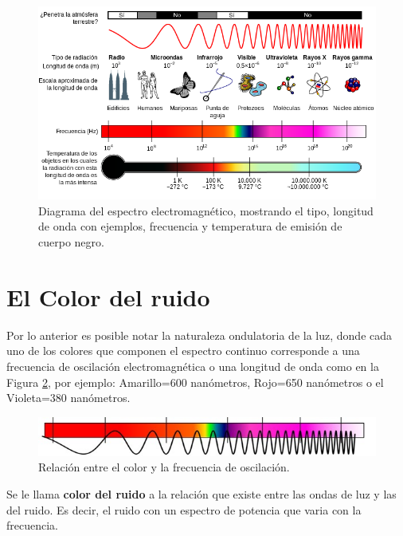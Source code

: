 \documentclass[letterpaper,titlepage,12pt,draft]{report}
\begin{document}
\begin{figure}[H]
\begin{center}
\includegraphics[scale=0.5]{ee.png}
\caption{Diagrama del espectro electromagn\'etico, mostrando el tipo, longitud de onda con ejemplos, frecuencia y temperatura de emisi\'on de cuerpo negro.}
\label{fig:ee}
\end{center}
\end{figure}

\section{El Color del ruido}

Por lo anterior es posible notar la naturaleza ondulatoria de la luz, donde cada uno de los colores que componen el espectro continuo corresponde a una frecuencia de oscilaci\'on electromagn\'etica o una longitud de onda como en la Figura \ref{fig:color}, por ejemplo: Amarillo=600 nan\'ometros, Rojo=650 nan\'ometros o el Violeta=380 nan\'ometros.\\

\begin{figure}[H]
\begin{center}
\includegraphics[scale=0.5]{espectro_onda.jpg}
\caption{Relaci\'on entre el color y la frecuencia de oscilaci\'on.}
\label{fig:color}
\end{center}
\end{figure}

Se le llama {\bf color del ruido} a la relaci\'on que existe entre las ondas de luz y las del ruido. Es decir, el ruido con un espectro de potencia que varia con la frecuencia. \cite{Miramontes}\\
\end{document}
